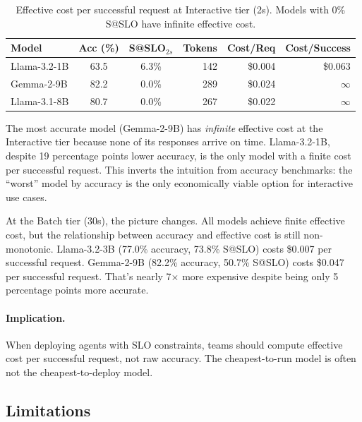 \documentclass[11pt]{article}
\begin{document}
\begin{table}[h]
\centering
\small
\caption{Effective cost per successful request at Interactive tier (2s).  Models with 0\% S@SLO have infinite effective cost.}
\label{tab:cost-analysis}
\begin{tabular}{lcc rr r}
\toprule
\textbf{Model} & \textbf{Acc (\%)} & \textbf{S@SLO$_{2s}$} & \textbf{Tokens} & \textbf{Cost/Req} & \textbf{Cost/Success} \\
\midrule
Llama-3.2-1B    & 63.5 & 6.3\% & 142 & \$0.004 & \$0.063 \\
Gemma-2-9B      & 82.2 & 0.0\% & 289 & \$0.024 & $\infty$ \\
Llama-3.1-8B    & 80.7 & 0.0\% & 267 & \$0.022 & $\infty$ \\
\bottomrule
\end{tabular}
\end{table}

The most accurate model (Gemma-2-9B) has \emph{infinite} effective cost at the Interactive tier because none of its responses arrive on time.  Llama-3.2-1B, despite 19 percentage points lower accuracy, is the only model with a finite cost per successful request.  This inverts the intuition from accuracy benchmarks: the ``worst'' model by accuracy is the only economically viable option for interactive use cases.

At the Batch tier (30s), the picture changes.  All models achieve finite effective cost, but the relationship between accuracy and effective cost is still non-monotonic.  Llama-3.2-3B (77.0\% accuracy, 73.8\% S@SLO) costs \$0.007 per successful request.  Gemma-2-9B (82.2\% accuracy, 50.7\% S@SLO) costs \$0.047 per successful request.  That's nearly 7$\times$ more expensive despite being only 5 percentage points more accurate.

\paragraph{Implication.} When deploying agents with SLO constraints, teams should compute effective cost per successful request, not raw accuracy.  The cheapest-to-run model is often not the cheapest-to-deploy model.

\subsection{Limitations}
\end{document}
